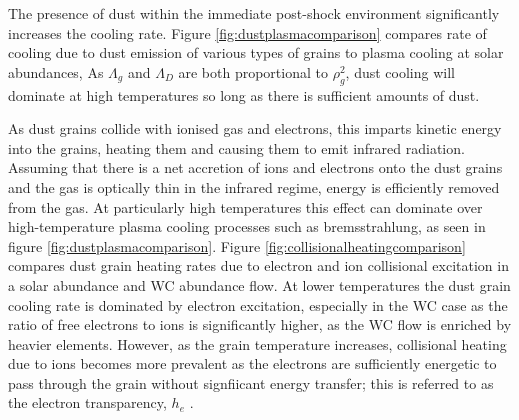 The presence of dust within the immediate post-shock environment significantly increases the cooling rate.
Figure \ref{fig:dustplasmacomparison} compares rate of cooling due to dust emission of various types of grains to plasma cooling at solar abundances, 
As $\Lambda_g$ and $\Lambda_D$ are both proportional to $\rho_g^2$, dust cooling will dominate at high temperatures so long as there is sufficient amounts of dust.

As dust grains collide with ionised gas and electrons, this imparts kinetic energy into the grains, heating them and causing them to emit infrared radiation. Assuming that there is a net accretion of ions and electrons onto the dust grains and the gas is optically thin in the infrared regime, energy is efficiently removed from the gas.
At particularly high temperatures this effect can dominate over high-temperature plasma cooling processes such as bremsstrahlung, as seen in figure \ref{fig:dustplasmacomparison}.
Figure \ref{fig:collisionalheatingcomparison} compares dust grain heating rates due to electron and ion collisional excitation in a solar abundance and WC abundance flow.
At lower temperatures the dust grain cooling rate is dominated by electron excitation, especially in the WC case as the ratio of free electrons to ions is significantly higher, as the WC flow is enriched by heavier elements.
However, as the grain temperature increases, collisional heating due to ions becomes more prevalent as the electrons are sufficiently energetic to pass through the grain without signfiicant energy transfer;
this is referred to as the electron transparency, $h_e$ \parencite{dwek_infrared_1981}.

